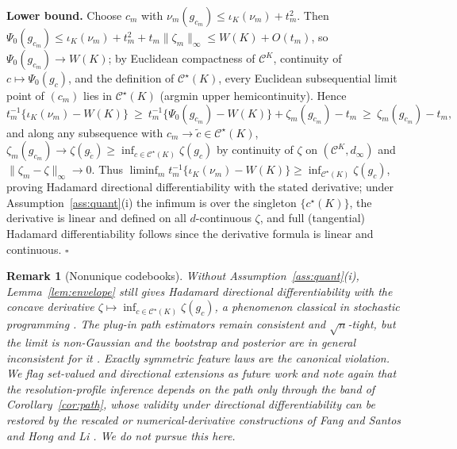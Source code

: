 \documentclass[11pt]{article}
\newtheorem{remark}{Remark}
\newcommand{\calC}{\mathcal C}
\newcommand{\norm}[1]{\lVert #1\rVert}
\begin{document}
\textbf{Lower bound.} Choose $c_m$ with $\nu_m(g_{c_m})\le\iota_K(\nu_m)+t_m^2$. Then
$\Psi_0(g_{c_m})\le\iota_K(\nu_m)+t_m^2+t_m\norm{\zeta_m}_\infty\le W(K)+O(t_m)$,
so $\Psi_0(g_{c_m})\to W(K)$; by Euclidean compactness of $\calC^K$, continuity of $c\mapsto\Psi_0(g_c)$, and the definition of $\calC^\star(K)$, every Euclidean subsequential limit point of $(c_m)$ lies in $\calC^\star(K)$ (argmin upper hemicontinuity). Hence
\begin{equation*}
t_m^{-1}\bigl\{\iota_K(\nu_m)-W(K)\bigr\}
\ \ge\ t_m^{-1}\bigl\{\Psi_0(g_{c_m})-W(K)\bigr\}+\zeta_m(g_{c_m})-t_m
\ \ge\ \zeta_m(g_{c_m})-t_m ,
\end{equation*}
and along any subsequence with $c_m\to\tilde c\in\calC^\star(K)$, $\zeta_m(g_{c_m})\to\zeta(g_{\tilde c})\ge\inf_{c\in\calC^\star(K)}\zeta(g_c)$ by continuity of $\zeta$ on $(\calC^K,d_\infty)$ and $\norm{\zeta_m-\zeta}_\infty\to0$. Thus $\liminf_m t_m^{-1}\{\iota_K(\nu_m)-W(K)\}\ge\inf_{\calC^\star(K)}\zeta(g_c)$, proving Hadamard directional differentiability with the stated derivative; under Assumption~\ref{ass:quant}(i) the infimum is over the singleton $\{c^\star(K)\}$, the derivative is linear and defined on all $d$-continuous $\zeta$, and full (tangential) Hadamard differentiability follows since the derivative formula is linear and continuous. \hfill$\square$

\begin{remark}[Nonunique codebooks]\label{rem:nonunique}
Without Assumption~\ref{ass:quant}\textup{(i)}, Lemma~\ref{lem:envelope} still gives Hadamard directional differentiability with the concave derivative $\zeta\mapsto\inf_{c\in\calC^\star(K)}\zeta(g_c)$, a phenomenon classical in stochastic programming \citep{shapiro1991,dumbgen1993}. The plug-in path estimators remain consistent and $\sqrt n$-tight, but the limit is non-Gaussian and the bootstrap and posterior are in general inconsistent for it \citep{fang2019}. Exactly symmetric feature laws are the canonical violation. We flag set-valued and directional extensions as future work and note again that the resolution-profile inference depends on the path only through the band of Corollary~\ref{cor:path}, whose validity under directional differentiability can be restored by the rescaled or numerical-derivative constructions of Fang and Santos \cite{fang2019} and Hong and Li \cite{hong2018}. We do not pursue this here.
\end{remark}
\end{document}
